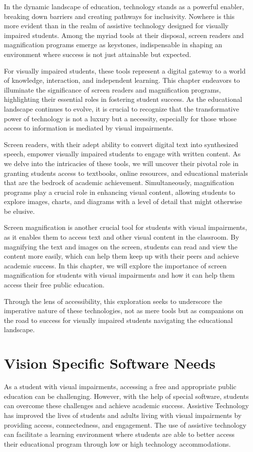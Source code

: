 \documentclass[12pt,letterpaper,twoside]{extreport}
\begin{document}
In the dynamic landscape of education, technology stands as a powerful enabler, breaking down barriers and creating pathways for inclusivity. Nowhere is this more evident than in the realm of assistive technology designed for visually impaired students. Among the myriad tools at their disposal, screen readers and magnification programs emerge as keystones, indispensable in shaping an environment where success is not just attainable but expected.

For visually impaired students, these tools represent a digital gateway to a world of knowledge, interaction, and independent learning. This chapter endeavors to illuminate the significance of screen readers and magnification programs, highlighting their essential roles in fostering student success. As the educational landscape continues to evolve, it is crucial to recognize that the transformative power of technology is not a luxury but a necessity, especially for those whose access to information is mediated by visual impairments.

Screen readers, with their adept ability to convert digital text into synthesized speech, empower visually impaired students to engage with written content. As we delve into the intricacies of these tools, we will uncover their pivotal role in granting students access to textbooks, online resources, and educational materials that are the bedrock of academic achievement. Simultaneously, magnification programs play a crucial role in enhancing visual content, allowing students to explore images, charts, and diagrams with a level of detail that might otherwise be elusive.

Screen magnification is another crucial tool for students with visual impairments, as it enables them to access text and other visual content in the classroom.  By magnifying the text and images on the screen, students can read and view the content more easily, which can help them keep up with their peers and achieve academic success. In this chapter, we will explore the importance of screen magnification for students with visual impairments and how it can help them access their free public education.

Through the lens of accessibility, this exploration seeks to underscore the imperative nature of these technologies, not as mere tools but as companions on the road to success for visually impaired students navigating the educational landscape.

\pagebreak \hypertarget{software-needs}{}\section{Vision Specific Software Needs}\label{software-needs}
As a student with visual impairments, accessing a free and appropriate public education can be challenging. However, with the help of special software, students can overcome these challenges and achieve academic success. Assistive Technology has improved the lives of students and adults living with visual impairments by providing access, connectedness, and engagement. The use of assistive technology can facilitate a learning environment where students are able to better access their educational program through low or high technology accommodations.
\end{document}
